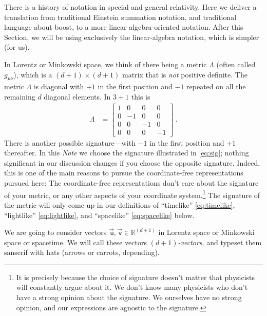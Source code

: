 \documentclass{article}
\newcommand\upvec[1]{\!\vec{\,\mathrm{#1}}}
\newcommand{\Lvec}[1]{\upvec{\mathsf{#1}}} %
\newcommand{\plus}{\!+\!} %
\newcommand{\documentname}{\textsl{Note}}
\begin{document}
There is a history of notation in special and general relativity.
Here we deliver a translation from traditional Einstein summation notation, and traditional language about boost, to a more linear-algebra-oriented notation.
After this Section, we will be using exclusively the linear-algebra notation, which is simpler (for us).

In Lorentz or Minkowski space, we think of there being a metric $\Lambda$ (often called $g_{\mu\nu}$), which is a $(d\plus1)\times(d\plus1)$ matrix that is \emph{not} positive definite.
The metric $\Lambda$ is diagonal with $+1$ in the first position and $-1$ repeated on all the remaining $d$ diagonal elements.
In $3\plus1$ this is
\begin{align}\label{eq:sig}
    \Lambda &= \begin{bmatrix}1 & 0 & 0 & 0\\
                              0 & -1 & 0 & 0\\
                              0 & 0 & -1 & 0\\
                              0 & 0 & 0 & -1\end{bmatrix} ~.
\end{align}
There is another possible signature---with $-1$ in the first position and $+1$ thereafter.
In this \documentname{} we choose the signature illustrated in \eqref{eq:sig}; nothing significant in our discussion changes if you choose the opposite signature.
Indeed, this is one of the main reasons to pursue the coordinate-free representations pursued here:
The coordinate-free representations don't care about the signature of your metric, or any other aspects of your coordinate system.\footnote{It is precisely because the choice of signature doesn't matter that physicists will constantly argue about it. We don't know many physicists who don't have a strong opinion about the signature. We ourselves have no strong opinion, and our expressions are agnostic to the signature.}
The signature of the metric will only come up in our definitions of ``timelike'' \eqref{eq:timelike}, ``lightlike'' \eqref{eq:lightlike}, and ``spacelike'' \eqref{eq:spacelike} below.

We are going to consider vectors $\Lvec{u}, \Lvec{v}\in\mathbb{R}^{(d+1)}$ in Lorentz space or Minkowski space or spacetime.
We will call these vectors \emph{$(d\plus1)$-vectors}, and typeset them sanserif with hats (arrows or carrots, depending).
\end{document}
